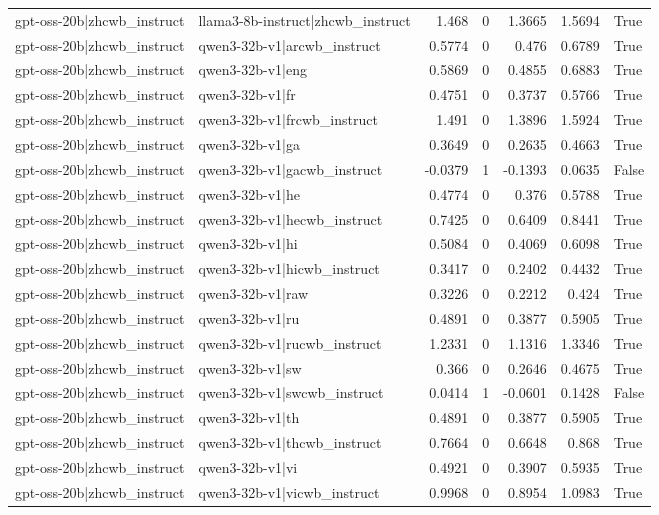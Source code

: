 \begin{table}
\begin{tabular}{l l r r r r l}
gpt-oss-20b|zhcwb_instruct & llama3-8b-instruct|zhcwb_instruct & 1.468 & 0 & 1.3665 & 1.5694 & True \\
gpt-oss-20b|zhcwb_instruct & qwen3-32b-v1|arcwb_instruct & 0.5774 & 0 & 0.476 & 0.6789 & True \\
gpt-oss-20b|zhcwb_instruct & qwen3-32b-v1|eng & 0.5869 & 0 & 0.4855 & 0.6883 & True \\
gpt-oss-20b|zhcwb_instruct & qwen3-32b-v1|fr & 0.4751 & 0 & 0.3737 & 0.5766 & True \\
gpt-oss-20b|zhcwb_instruct & qwen3-32b-v1|frcwb_instruct & 1.491 & 0 & 1.3896 & 1.5924 & True \\
gpt-oss-20b|zhcwb_instruct & qwen3-32b-v1|ga & 0.3649 & 0 & 0.2635 & 0.4663 & True \\
gpt-oss-20b|zhcwb_instruct & qwen3-32b-v1|gacwb_instruct & -0.0379 & 1 & -0.1393 & 0.0635 & False \\
gpt-oss-20b|zhcwb_instruct & qwen3-32b-v1|he & 0.4774 & 0 & 0.376 & 0.5788 & True \\
gpt-oss-20b|zhcwb_instruct & qwen3-32b-v1|hecwb_instruct & 0.7425 & 0 & 0.6409 & 0.8441 & True \\
gpt-oss-20b|zhcwb_instruct & qwen3-32b-v1|hi & 0.5084 & 0 & 0.4069 & 0.6098 & True \\
gpt-oss-20b|zhcwb_instruct & qwen3-32b-v1|hicwb_instruct & 0.3417 & 0 & 0.2402 & 0.4432 & True \\
gpt-oss-20b|zhcwb_instruct & qwen3-32b-v1|raw & 0.3226 & 0 & 0.2212 & 0.424 & True \\
gpt-oss-20b|zhcwb_instruct & qwen3-32b-v1|ru & 0.4891 & 0 & 0.3877 & 0.5905 & True \\
gpt-oss-20b|zhcwb_instruct & qwen3-32b-v1|rucwb_instruct & 1.2331 & 0 & 1.1316 & 1.3346 & True \\
gpt-oss-20b|zhcwb_instruct & qwen3-32b-v1|sw & 0.366 & 0 & 0.2646 & 0.4675 & True \\
gpt-oss-20b|zhcwb_instruct & qwen3-32b-v1|swcwb_instruct & 0.0414 & 1 & -0.0601 & 0.1428 & False \\
gpt-oss-20b|zhcwb_instruct & qwen3-32b-v1|th & 0.4891 & 0 & 0.3877 & 0.5905 & True \\
gpt-oss-20b|zhcwb_instruct & qwen3-32b-v1|thcwb_instruct & 0.7664 & 0 & 0.6648 & 0.868 & True \\
gpt-oss-20b|zhcwb_instruct & qwen3-32b-v1|vi & 0.4921 & 0 & 0.3907 & 0.5935 & True \\
gpt-oss-20b|zhcwb_instruct & qwen3-32b-v1|vicwb_instruct & 0.9968 & 0 & 0.8954 & 1.0983 & True \\

\end{tabular}
\end{table}
